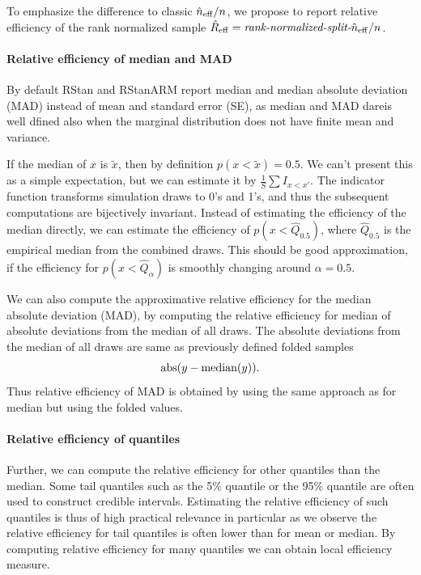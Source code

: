 \documentclass[11pt]{article}
\begin{document}
To emphasize the difference to classic $\hat{n}_{\rm eff}/n$, we
propose to report relative efficiency of the rank normalized sample
$\hat{R}_{\rm eff} = \text{\it rank-normalized-split-}\hat{n}_{\rm eff}/n$.

\paragraph{Relative efficiency of median and MAD}

By default RStan and RStanARM report median and median absolute
deviation (MAD) instead of mean and standard error (SE), as median and
MAD dareis well dfined also when the marginal distribution does not
have finite mean and variance.

If the median of $x$ is $\tilde{x}$, then by definition
$p(x < \tilde{x}) = 0.5$.  We can't present this as a simple
expectation, but we can estimate it by $\frac{1}{S}\sum I_{x<x'}$. The
indicator function transforms simulation draws to 0's and 1's, and
thus the subsequent computations are bijectively invariant. Instead of
estimating the efficiency of the median directly, we can estimate the
efficiency of $p(x < \hat{Q}_{0.5})$, where $\hat{Q}_{0.5}$ is the
empirical median from the combined draws. This should be good
approximation, if the efficiency for $p(x < \hat{Q}_{\alpha})$ is
smoothly changing around $\alpha = 0.5$.

We can also compute the approximative relative efficiency for the median 
absolute deviation (MAD), by computing the relative
efficiency for median of absolute deviations from the median of all draws.
The absolute deviations from the median of all draws are same as previously defined folded samples
\begin{equation}
  {\rm abs}(y-{\rm median}(y)).
\end{equation}
Thus relative efficiency of MAD is obtained by using the same approach as for median but using the folded values.

\paragraph{Relative efficiency of quantiles}

Further, we can compute the relative efficiency for other quantiles than the 
median. Some tail quantiles such as the 5\% quantile or the 95\% quantile
are often used to construct credible intervals. Estimating the relative
efficiency of such quantiles is thus of high practical relevance in particular
as we observe the relative efficiency for tail quantiles is often
lower than for mean or median. By computing relative efficiency for many quantiles we can obtain local efficiency measure.
\end{document}
